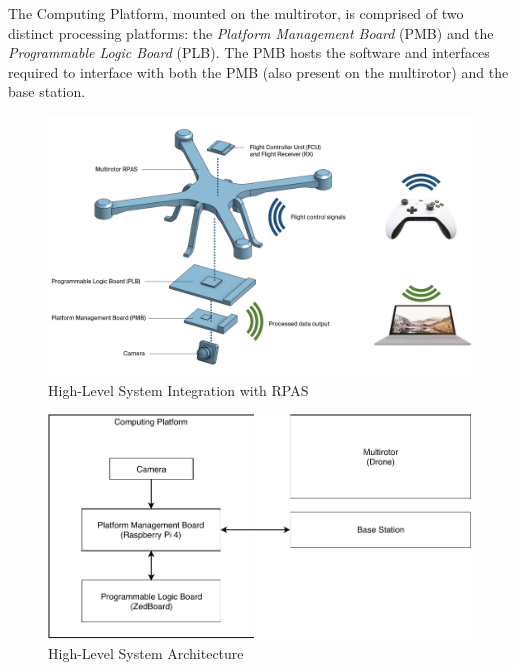 The Computing Platform, mounted on the multirotor, is comprised of two distinct processing platforms: the \textit{Platform Management Board} (PMB) and the \textit{Programmable Logic Board} (PLB). The PMB hosts the software and interfaces required to interface with both the PMB (also present on the multirotor) and the base station.

\begin{figure}[H]\label{hlpic}
    \centering
    \includegraphics[width=\linewidth]{img/intpic}
\caption{High-Level System Integration with RPAS}
\end{figure}

\begin{figure}[H]\label{hldiag}
\centering
\includegraphics[width=15cm]{img/highlevel.pdf}
\caption{High-Level System Architecture}
\end{figure}

